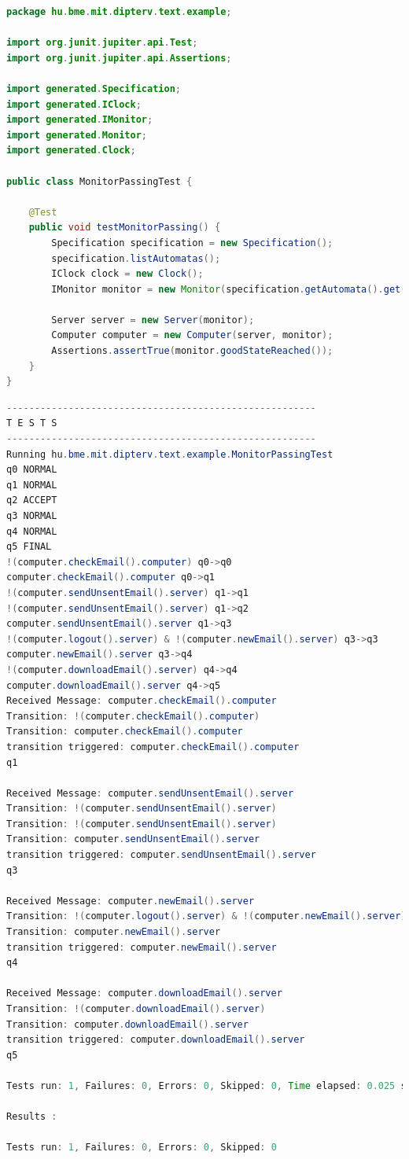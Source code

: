 \begin{lstlisting}[language=java, frame=single, float=ht!, caption={Integrációs teszteset.},captionpos=b]
package hu.bme.mit.dipterv.text.example;

import org.junit.jupiter.api.Test;
import org.junit.jupiter.api.Assertions;

import generated.Specification;
import generated.IClock;
import generated.IMonitor;
import generated.Monitor;
import generated.Clock;

public class MonitorPassingTest {

	@Test
	public void testMonitorPassing() {
		Specification specification = new Specification();
		specification.listAutomatas();
		IClock clock = new Clock();
		IMonitor monitor = new Monitor(specification.getAutomata().get(0), clock);

		Server server = new Server(monitor);
		Computer computer = new Computer(server, monitor);
		Assertions.assertTrue(monitor.goodStateReached());
	}
}
\end{lstlisting}

\begin{lstlisting}[language=java, frame=single, float=ht!, caption={Integrációs teszteset eredménye.},captionpos=b]
-------------------------------------------------------
T E S T S
-------------------------------------------------------
Running hu.bme.mit.dipterv.text.example.MonitorPassingTest
q0 NORMAL
q1 NORMAL
q2 ACCEPT
q3 NORMAL
q4 NORMAL
q5 FINAL
!(computer.checkEmail().computer) q0->q0
computer.checkEmail().computer q0->q1
!(computer.sendUnsentEmail().server) q1->q1
!(computer.sendUnsentEmail().server) q1->q2
computer.sendUnsentEmail().server q1->q3
!(computer.logout().server) & !(computer.newEmail().server) q3->q3
computer.newEmail().server q3->q4
!(computer.downloadEmail().server) q4->q4
computer.downloadEmail().server q4->q5
Received Message: computer.checkEmail().computer
Transition: !(computer.checkEmail().computer)
Transition: computer.checkEmail().computer
transition triggered: computer.checkEmail().computer
q1

Received Message: computer.sendUnsentEmail().server
Transition: !(computer.sendUnsentEmail().server)
Transition: !(computer.sendUnsentEmail().server)
Transition: computer.sendUnsentEmail().server
transition triggered: computer.sendUnsentEmail().server
q3

Received Message: computer.newEmail().server
Transition: !(computer.logout().server) & !(computer.newEmail().server)
Transition: computer.newEmail().server
transition triggered: computer.newEmail().server
q4

Received Message: computer.downloadEmail().server
Transition: !(computer.downloadEmail().server)
Transition: computer.downloadEmail().server
transition triggered: computer.downloadEmail().server
q5

Tests run: 1, Failures: 0, Errors: 0, Skipped: 0, Time elapsed: 0.025 sec

Results :

Tests run: 1, Failures: 0, Errors: 0, Skipped: 0
\end{lstlisting}

